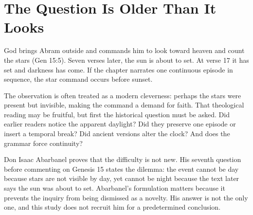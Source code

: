 
\section{The Question Is Older Than It Looks}

God brings Abram outside and commands him to look toward heaven and count the
stars (Gen 15:5). Seven verses later, the sun is about to set. At verse 17 it
has set and darkness has come. If the chapter narrates one continuous episode
in sequence, the star command occurs before sunset.

The observation is often treated as a modern cleverness: perhaps the stars
were present but invisible, making the command a demand for faith. That
theological reading may be fruitful, but first the historical question must be
asked. Did earlier readers notice the apparent daylight? Did they preserve one
episode or insert a temporal break? Did ancient versions alter the clock? And
does the grammar force continuity?

Don Isaac Abarbanel proves that the difficulty is not new. His seventh question
before commenting on Genesis 15 states the dilemma: the event cannot be day
because stars are not visible by day, yet cannot be night because the text
later says the sun was about to set. Abarbanel's formulation matters because it
prevents the inquiry from being dismissed as a novelty. His answer is not the
only one, and this study does not recruit him for a predetermined conclusion.

